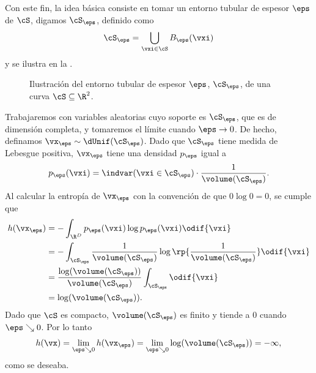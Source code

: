 \documentclass[../../book-main_es.tex]{subfiles}
\begin{document}
Con este fin, la idea básica consiste en tomar un entorno tubular de espesor \(\eps\) de
\(\cS\), digamos \(\cS_{\eps}\), definido como
\begin{equation}
    \cS_{\eps} = \bigcup_{\vxi \in \cS}B_{\eps}(\vxi)
\end{equation}
y se ilustra en la .
\begin{figure}[th]
    \centering
    \caption{Ilustración del entorno tubular de espesor \(\eps\), \(\cS_\eps\), de
    una curva \(\cS \subseteq \R^{2}\).}
    \label{fig:entropy_eps_thickening}
\end{figure}
Trabajaremos con variables aleatorias cuyo soporte es \(\cS_{\eps}\),
que es de dimensión completa, y tomaremos el límite cuando \(\eps \to 0\).
De hecho, definamos \(\vx_{\eps} \sim \dUnif(\cS_{\eps})\). Dado que
\(\cS_{\eps}\) tiene medida de Lebesgue positiva, \(\vx_{\eps}\) tiene una densidad
\(p_{\eps}\) igual a
\begin{equation}
    p_{\eps}(\vxi) = \indvar(\vxi \in \cS_{\eps}) \cdot
    \frac{1}{\volume(\cS_{\eps})}.
\end{equation}
Al calcular la entropía de \(\vx_{\eps}\) con la convención de que \(0
\log 0 = 0\), se cumple que
\begin{align}
    h(\vx_{\eps})
    &= -\int_{\R^{D}}p_{\eps}(\vxi)\log p_{\eps}(\vxi)\odif{\vxi} \\
    &= -\int_{\cS_{\eps}}\frac{1}{\volume(\cS_{\eps})}
    \log\rp{\frac{1}{\volume(\cS_{\eps})}}\odif{\vxi} \\
    &=
    \frac{\log(\volume(\cS_{\eps}))}{\volume(\cS_{\eps})}\int_{\cS_{\eps}}\odif{\vxi}
    \\
    &= \log(\volume(\cS_{\eps})).
\end{align}
Dado que \(\cS\) es compacto, \(\volume(\cS_{\eps})\) es finito y tiende
a \(0\) cuando \(\eps \searrow 0\). Por lo tanto
\begin{equation}
    h(\vx) = \lim_{\eps \searrow 0}h(\vx_{\eps}) = \lim_{\eps
    \searrow 0}\log(\volume(\cS_{\eps})) = -\infty,
\end{equation}
como se deseaba.
\end{document}
